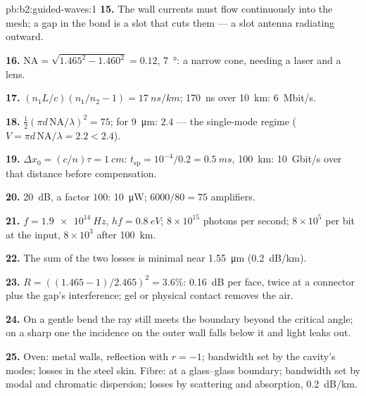 \begin{solution}{pb:b2:guided-waves:1}
\textbf{15.} The wall currents must flow continuously into the mesh;
a gap in the bond is a slot that cuts them --- a slot antenna
radiating outward.

\textbf{16.} $\mathrm{NA} = \sqrt{1.465^2 - 1.460^2} = 0.12$, \qty{7}{\degree}: a narrow
cone, needing a laser and a lens.

\textbf{17.} $(n_1L/c)(n_1/n_2 - 1) = \qty{17}{ns/km}$; \qty{170}{ns} over \qty{10}{km}:
\qty{6}{Mbit/s}.

\textbf{18.} $\tfrac12(\pi d\,\mathrm{NA}/\lambda)^2 = 75$; for \qty{9}{\micro m}: $2.4$ --- the
single-mode regime ($V = \pi d\,\mathrm{NA}/\lambda = 2.2 < 2.4$).

\textbf{19.} $\Delta x_0 = (c/n)\tau = \qty{1}{cm}$: $t_{\text{sp}} = 10^{-4}/0.2 = \qty{0.5}{ms}$,
\qty{100}{km}: \qty{10}{Gbit/s} over that distance before compensation.

\textbf{20.} \qty{20}{dB}, a factor $100$: \qty{10}{\micro W}; $6000/80 = 75$
amplifiers.

\textbf{21.} $f = \qty{1.9e14}{Hz}$, $hf = \qty{0.8}{eV}$; $8 \times 10^{15}$ photons per
second; $8 \times 10^5$ per bit at the input, $8 \times 10^3$ after \qty{100}{km}.

\textbf{22.} The sum of the two losses is minimal near \qty{1.55}{\micro m}
(\qty{0.2}{dB/km}).

\textbf{23.} $R = ((1.465 - 1)/2.465)^2 = 3.6\%$: \qty{0.16}{dB} per face, twice
at a connector plus the gap's interference; gel or physical contact
removes the air.

\textbf{24.} On a gentle bend the ray still meets the boundary beyond
the critical angle; on a sharp one the incidence on the outer wall
falls below it and light leaks out.

\textbf{25.} Oven: metal walls, reflection with $r = -1$; bandwidth set
by the cavity's modes; losses in the steel skin. Fibre:  at a glass--glass boundary; bandwidth set by modal and
chromatic dispersion; losses by scattering and absorption, \qty{0.2}{dB/km}.
\end{solution}
